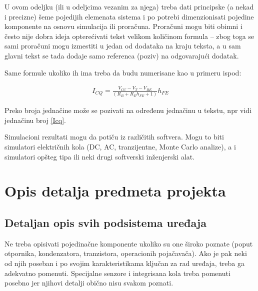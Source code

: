 \documentclass[a4paper, 12pt]{article}
\begin{document}
\vspace{10pt}

U ovom odeljku (ili u odeljcima vezanim za njega) treba dati principske (a nekad i precizne) šeme pojedijih elemenata sistema i po potrebi dimenzionisati pojedine komponente na osnovu simulacija ili proračuna. Proračuni mogu biti obimni i često nije dobra ideja opterećivati tekst velikom količinom formula – zbog toga se sami proračuni mogu izmestiti u jedan od dodataka na kraju teksta, a u sam glavni tekst se tada dodaje samo referenca (poziv) na odgovarajući dodatak.

\vspace{10pt}

Same formule ukoliko ih ima treba da budu numerisane kao u primeru ispod:

\begin{align}
I_{CQ}= \frac{ V_{CC}-V_T-V_{BE} }{ \left(R_B+R_E h_{FE}+1 \right) }h_{FE}  \label{Icq}
\end{align}

\vspace{10pt}

Preko broja jednačine može se pozivati na određenu jednačinu u tekstu, npr vidi jednačinu broj \ref{Icq}.

\vspace{10pt}

Simulacioni rezultati mogu da potiču iz različitih softvera. Mogu to biti simulatori električnih kola (DC, AC, tranzijentne, Monte Carlo analize), a i simulatori opšteg tipa ili neki drugi softverski inženjerski alat.

\pagebreak

\section{Opis detalja predmeta projekta}

\vspace{10pt}
	
	\subsection{Detaljan opis svih podsistema uređaja}

\vspace{10pt}
	
	Ne treba opisivati pojedinačne komponente ukoliko su one široko poznate (poput otpornika, kondenzatora, tranzistora, operacionih pojačavača). Ako je pak neki od njih poseban i po svojim karakteristikama ključan za rad uređaja, treba ga adekvatno pomenuti. Specijalne senzore i integrisana kola treba pomenuti posebno jer njihovi detalji obično nisu svakom poznati.
\end{document}
